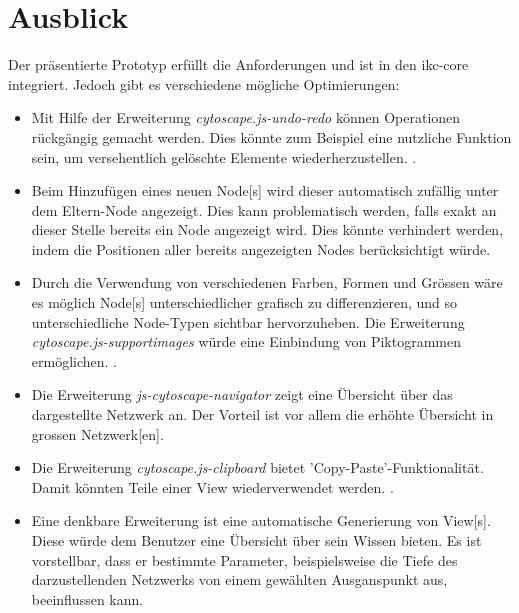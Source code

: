 \section{Ausblick}
Der präsentierte Prototyp erfüllt die Anforderungen und ist in den \gls{ikc-core} integriert. Jedoch gibt es verschiedene mögliche Optimierungen:
\begin{itemize}
    \item Mit Hilfe der Erweiterung \textit{cytoscape.js-undo-redo} können Operationen rückgängig gemacht werden. Dies könnte zum Beispiel eine nutzliche Funktion sein, um versehentlich gelöschte Elemente wiederherzustellen. \citep{cytoscape-js-undo-redo}.
    \item Beim Hinzufügen eines neuen \gls{Node}[s] wird dieser automatisch zufällig unter dem Eltern-\gls{Node} angezeigt. Dies kann problematisch werden, falls exakt an dieser Stelle bereits ein \gls{Node} angezeigt wird. Dies könnte verhindert werden, indem die Positionen aller bereits angezeigten Nodes berücksichtigt würde.
    \item Durch die Verwendung von verschiedenen Farben, Formen und Grössen wäre es möglich \gls{Node}[s] unterschiedlicher grafisch zu differenzieren, und so unterschiedliche \gls{Node}-Typen sichtbar hervorzuheben. Die Erweiterung \textit{cytoscape.js-supportimages} würde eine Einbindung von Piktogrammen ermöglichen. \citep{cytoscape-js-supportimages}.
    \item Die Erweiterung \textit{js-cytoscape-navigator} zeigt eine Übersicht über das dargestellte Netzwerk an. Der Vorteil ist vor allem die erhöhte Übersicht in grossen \gls{Netzwerk}[en].
    \item Die Erweiterung \textit{cytoscape.js-clipboard} bietet 'Copy-Paste'-Funk\-tio\-na\-li\-tät. Damit könnten Teile einer \gls{View} wiederverwendet werden. \citep{cytoscape-js-clipboard}.
    \item Eine denkbare Erweiterung ist eine automatische Generierung von \gls{View}[s]. Diese würde dem Benutzer eine Übersicht über sein Wissen bieten. Es ist vorstellbar, dass er bestimmte Parameter, beispielsweise die Tiefe des darzustellenden Netzwerks von einem gewählten Ausganspunkt aus, beeinflussen kann. 

\end{itemize}
